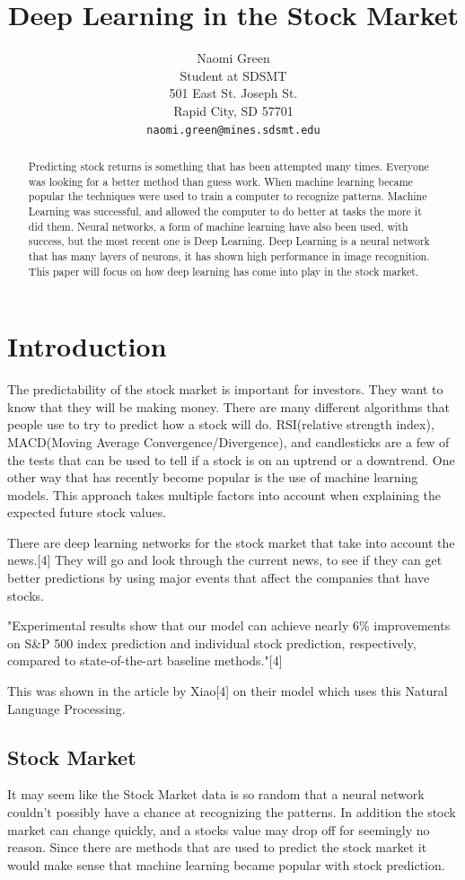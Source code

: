 \documentclass{article}
\title{Deep Learning in the Stock Market}
\author{
  Naomi Green\\
  Student at SDSMT\\
  501 East St. Joseph St. \\
  Rapid City, SD 57701 \\
  \texttt{naomi.green@mines.sdsmt.edu} \\
}
\begin{document}
\maketitle

\begin{abstract}
Predicting stock returns is something that has been attempted many times.
Everyone was looking for a better method than guess work.
When machine learning became popular the techniques were used to train a computer to recognize patterns.
Machine Learning was successful, and allowed the computer to do better at tasks the more it did them.
Neural networks, a form of machine learning have also been used, with success, but the most recent one is Deep Learning. 
Deep Learning is a neural network that has many layers of neurons, it has shown high performance in image recognition. 
This paper will focus on how deep learning has come into play in the stock market.
\end{abstract}

\section{Introduction}
The predictability of the stock market is important for investors.
They want to know that they will be making money.
There are many different algorithms that people use to try to predict how a stock will do. 
RSI(relative strength index), MACD(Moving Average Convergence/Divergence), and candlesticks are a few of the tests that can be used to tell if a stock is on an uptrend or a downtrend. 
One other way that has recently become popular is the use of machine learning models. 
This approach takes multiple factors into account when explaining the expected future stock values.

There are deep learning networks for the stock market that take into account the news.[4]
They will go and look through the current news, to see if they can get better predictions by using major events that affect the companies that have stocks.

"Experimental results show that our model can achieve nearly 6\% improvements on S\&P 500 index prediction and individual stock prediction, respectively, compared to state-of-the-art baseline methods."[4]

This was shown in the article by Xiao[4] on their model which uses this Natural Language Processing.


\subsection{Stock Market}
It may seem like the Stock Market data is so random that a neural network couldn't possibly have a chance at recognizing the patterns. 
In addition the stock market can change quickly, and a stocks value may drop off for seemingly no reason.
Since there are methods that are used to predict the stock market it would make sense that machine learning became popular with stock prediction.
\end{document}
